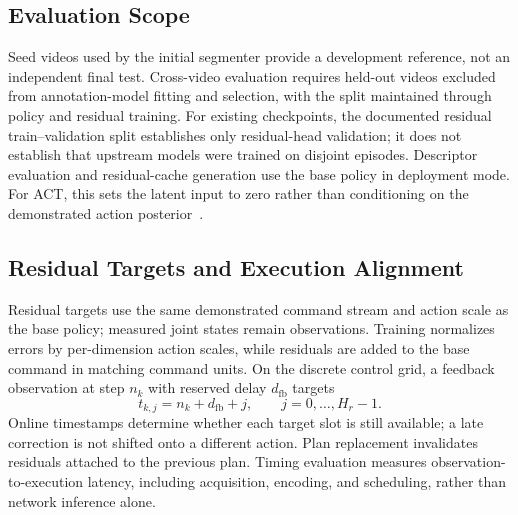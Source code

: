\subsection{Evaluation Scope}
\label{app:datascope}
Seed videos used by the initial segmenter provide a development reference, not an independent final test.
Cross-video evaluation requires held-out videos excluded from annotation-model fitting and selection, with the split maintained through policy and residual training.
For existing checkpoints, the documented residual train--validation split establishes only residual-head validation; it does not establish that upstream models were trained on disjoint episodes.
Descriptor evaluation and residual-cache generation use the base policy in deployment mode.
For ACT, this sets the latent input to zero rather than conditioning on the demonstrated action posterior~\cite{zhao2023act}.

\subsection{Residual Targets and Execution Alignment}
\label{app:slottiming}
Residual targets use the same demonstrated command stream and action scale as the base policy; measured joint states remain observations.
Training normalizes errors by per-dimension action scales, while residuals are added to the base command in matching command units.
On the discrete control grid, a feedback observation at step $n_k$ with reserved delay $d_{\mathrm{fb}}$ targets
\begin{equation}
 t_{k,j}=n_k+d_{\mathrm{fb}}+j,
 \qquad j=0,\ldots,H_r-1.
 \label{eq:methodslots}
\end{equation}
Online timestamps determine whether each target slot is still available; a late correction is not shifted onto a different action.
Plan replacement invalidates residuals attached to the previous plan.
Timing evaluation measures observation-to-execution latency, including acquisition, encoding, and scheduling, rather than network inference alone.

